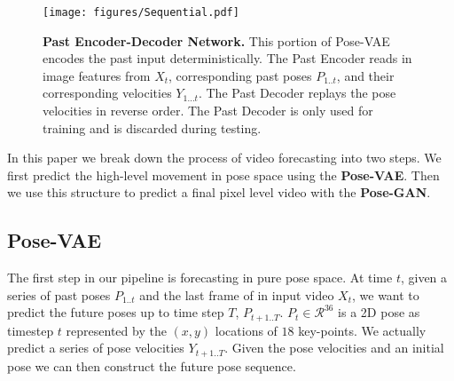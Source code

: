 \begin{figure}
\centering
\texttt{[image: figures/Sequential.pdf]} 
\caption{{\bf Past Encoder-Decoder Network.} This portion of Pose-VAE encodes the past input deterministically. The Past Encoder reads in image features from $X_{t}$, corresponding past poses $P_{1..t}$, and their corresponding velocities $Y_{1...t}$. The Past Decoder replays the pose velocities in reverse order. The Past Decoder is only used for training and is discarded during testing. }
\label{fig:SequentialPast}
\end{figure}

In this paper we break down the process of video forecasting into two steps. We first predict the high-level movement in pose space using the \textbf{Pose-VAE}.
Then we use this structure to predict a final pixel level video with the \textbf{Pose-GAN}. 

\subsection{Pose-VAE}
The first step in our pipeline is forecasting in pure pose space. At time $t$, given a series of past poses $P_{1..t}$ and the last frame of in input video $X_{t}$, we want to predict the future poses up to time step $T$, $P_{t+1..T}$. $P_t \in \mathcal{R}^{36}$ is a 2D pose as timestep $t$ represented by the $(x,y)$ locations of $18$ key-points. We actually predict a series of pose velocities $Y_{t+1..T}$.
Given the pose velocities and an initial pose we can then construct the future pose sequence.



